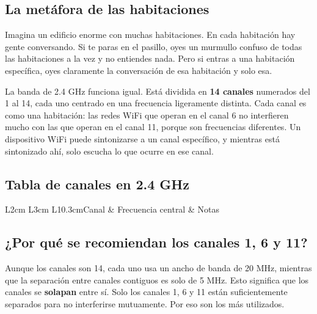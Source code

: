 \documentclass[11pt,a4paper]{article}
\begin{document}
\subsection{La metáfora de las habitaciones}
Imagina un edificio enorme con muchas habitaciones. En cada habitación hay
gente conversando. Si te paras en el pasillo, oyes un murmullo confuso de
todas las habitaciones a la vez y no entiendes nada. Pero si entras a una
habitación específica, oyes claramente la conversación de esa habitación
y solo esa.

La banda de 2.4 GHz funciona igual. Está dividida en \textbf{14 canales}
numerados del 1 al 14, cada uno centrado en una frecuencia ligeramente
distinta. Cada canal es como una habitación: las redes WiFi que operan en
el canal 6 no interfieren mucho con las que operan en el canal 11, porque
son frecuencias diferentes. Un dispositivo WiFi puede sintonizarse a un
canal específico, y mientras está sintonizado ahí, solo escucha lo que
ocurre en ese canal.

\subsection{Tabla de canales en 2.4 GHz}

\begin{datatable}{L{2cm} L{3cm} L{10.3cm}}{Canal & Frecuencia central & Notas}
\end{datatable}

\subsection{¿Por qué se recomiendan los canales 1, 6 y 11?}
Aunque los canales son 14, cada uno usa un ancho de banda de 20 MHz, mientras
que la separación entre canales contiguos es solo de 5 MHz. Esto significa
que los canales se \textbf{solapan} entre sí. Solo los canales 1, 6 y 11
están suficientemente separados para no interferirse mutuamente. Por eso son
los más utilizados.
\end{document}
